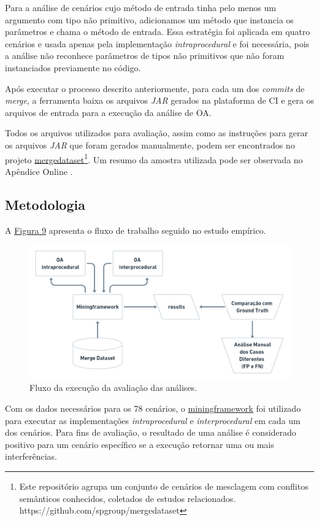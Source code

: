 Para a análise de cenários cujo método de entrada tinha pelo menos um argumento com tipo não primitivo, adicionamos um método que instancia os parâmetros e chama o método de entrada. Essa estratégia foi aplicada em quatro cenários e usada apenas pela implementação \emph{intraprocedural} e foi necessária, pois a análise não reconhece parâmetros de tipos não primitivos que não foram instanciados previamente no código. 

Após executar o processo descrito anteriormente, para cada um dos \emph{commits} de \emph{merge}, a ferramenta baixa os arquivos \emph{JAR} gerados na plataforma de CI e gera os arquivos de entrada para a execução da análise de OA.

Todos os arquivos utilizados para avaliação, assim como as instruções para gerar os arquivos \emph{JAR} que foram gerados manualmente, podem ser encontrados no projeto \href{https://github.com/spgroup/mergedataset}{mergedataset}\footnote{Este repositório agrupa um conjunto de cenários de mesclagem com conflitos semânticos conhecidos, coletados de estudos relacionados. https://github.com/spgroup/mergedataset}. Um resumo da amostra utilizada pode ser observada no Apêndice Online .

\subsection{Metodologia}
\label{sec:metodologia}

A \hyperref[fig:fluxo-execucao]{Figura 9} apresenta o fluxo de trabalho seguido no estudo empírico.

\begin{figure}[!h]
    \centering
    \includegraphics[width=0.8\linewidth]{images/Fluxo da avaliação.png}
    \caption{Fluxo da execução da avaliação das análises.}
    \label{fig:fluxo-execucao}
\end{figure}


Com os dados necessários para os 78 cenários, o \href{https://github.com/spgroup/miningframework}{miningframework} foi utilizado para executar as implementações  \emph{intraprocedural} e  \emph{interprocedural} em cada um dos cenários. Para fins de avaliação, o resultado de uma análise é considerado positivo para um cenário específico se a execução retornar uma ou mais interferências.

